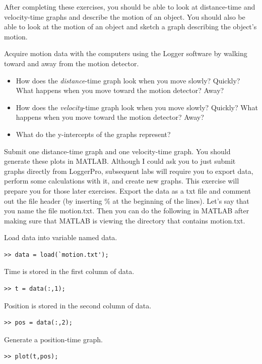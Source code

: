 \documentclass[11pt,letterpaper]{article}
\newcounter{question}[section]
\begin{document}
After completing these exercises, you should be able to look at distance-time and velocity-time graphs and describe the motion of an object.  You should also be able to look at the motion of an object and sketch a graph describing the object's motion.  

\question{} Acquire motion data with the computers using the Logger software by walking toward and away from the motion detector.

\begin{itemize}
\item How does the \textit{distance}-time graph look when you move slowly?  Quickly?
What happens when you move toward the motion detector?  Away? \vspace{3cm}  
\item How does the \textit{velocity}-time graph look when you move slowly?  Quickly?
What happens when you move toward the motion detector?  Away?  \vspace{3cm}
\item What do the y-intercepts of the graphs represent? \vspace{3cm}
\end{itemize}

Submit one distance-time graph and one velocity-time graph. You should generate these plots in MATLAB. Although I could ask you to just submit graphs directly from LoggerPro, subsequent labs will require you to export data, perform some calculations with it, and create new graphs. This exercise will prepare you for those later exercises. Export the data as a txt file and comment out the file header (by inserting \% at the beginning of the lines). Let's say that you name the file motion.txt. Then you can do the following in MATLAB after making sure that MATLAB is viewing the directory that contains motion.txt.

Load data into variable named data.
\begin{verbatim}>> data = load(`motion.txt');\end{verbatim}

Time is stored in the first column of data.
\begin{verbatim}>> t = data(:,1);\end{verbatim}

Position is stored in the second column of data.
\begin{verbatim}>> pos = data(:,2);\end{verbatim}

Generate a position-time graph.
\begin{verbatim}>> plot(t,pos);\end{verbatim}
\end{document}
